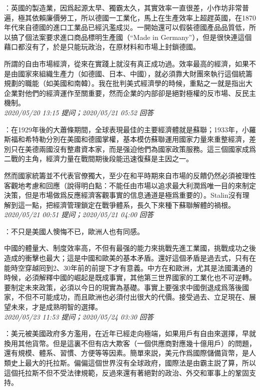 \documentclass[twocolumn]{ctexart}
\begin{document}
：英國的製造業，因爲起源太早、獨霸太久，其實效率一直很差，小作坊非常普遍，極其依賴廉價勞工，所以德國一工業化，馬上在生產效率上超趕英國，在1870年代來自德國的進口工業品已經汎濫成災。一開始還可以假裝德國產品品質低，所以搞了個法案要求進口商品標明生產國（“Made in Germany”），但是很快連這個藉口都沒有了，於是只能玩政治，在原材料和市場上封鎖德國。

所謂的自由市場經濟，從來在實踐上就沒有真正成功過。效率最高的經濟，如果不是由國家來組織生產力（如德國、日本、中國），就必須靠大財團來執行這個統籌規劃的職能（如美國和南韓）。我在批判美式經濟學的時候，重點之一就是指出大企業對他們的經濟運作至關重要，然而企業的内部卻是絕對極權的反市場、反民主機制。
\\

\textit{\hfill\noindent\small 2020/05/20 13:15 提问；2020/05/21 05:52 回答}

：在1929年後的大蕭條期間，全球表現最佳的主要經濟體就是蘇聯；1933年，小羅斯福和希特勒分別在美國和德國掌權，基本模仿蘇聯運用國家力量來重整經濟，差別只在美德兩國沒有整肅資本家，而是强迫他們為國家政策服務。這三個國家成爲二戰的主角，經濟力量在戰間期後段能迅速復蘇是主因之一。

然而國家統籌並不代表官僚獨大，至少在和平時期來自市場的反饋仍然必須被理性客觀地考慮和回應（說得明白點：不能任由市場以追求最大利潤爲唯一目的來制定決策，但是市場做爲反應經濟客觀事實的信息通道是極爲重要的）。Stalin沒有理解到這一點，把經濟管理鎖定在戰爭體系，長久下來種下蘇聯解體的禍根。
\\

\textit{\hfill\noindent\small 2020/05/21 00:51 提问；2020/05/21 04:00 回答}

：不只是美國人懊悔不已，歐洲人也有同感。

中國的體量大、制度效率高，不但有最强的能力來挑戰先進工業國，挑戰成功之後造成的衝擊也最大；這是中國和歐美的基本矛盾。還好這個矛盾是過去式，只有在能時空穿越囘到2、30年前的前提下才有意義。中方在和歐洲，尤其是法國溝通的時候，必須解釋中國的崛起是既成事實，其他第三世界國家的工業化也不可逆轉。要制定未來政策，必須以今日的現實為基礎。事實上要强求中國倒退成爲落後國家，不但不可能成功，而且歐洲也必須付出很大的代價。接受過去、立足現在、展望未來，才是成熟明智的選擇。
\\

\textit{\hfill\noindent\small 2020/05/23 11:53 提问；2020/05/24 03:30 回答}

：美元被美國政府多方濫用，在近年已經走向極端，如果用戶有自由來選擇，早就換用其他貨幣。但是這裏不但有店大欺客（一個供應商對應幾十億用戶）的問題，還有規模、體系、習慣、方便等等因素。簡單來説，美元作爲國際儲備貨幣，是人類史上最大的托拉斯。偏偏這個世界沒有全球政府，國際法是由霸主説了算，所以這個托拉斯不但不受法律規範，反過來還有著絕對的政治、外交和軍事上的鞏固支持。
\end{document}

